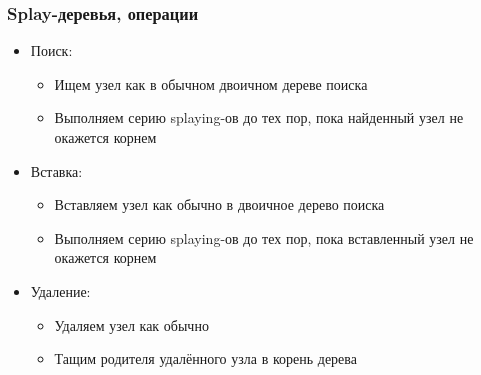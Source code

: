 \documentclass[xetex,mathserif,serif]{beamer}
\begin{document}
	\begin{frame}
		\frametitle{Splay-деревья, операции}
		\begin{itemize}
			\item Поиск:
			\begin{itemize}
				\item Ищем узел как в обычном двоичном дереве поиска
				\item Выполняем серию splaying-ов до тех пор, пока найденный узел не окажется корнем
			\end{itemize}
			\item Вставка:
			\begin{itemize}
				\item Вставляем узел как обычно в двоичное дерево поиска
				\item Выполняем серию splaying-ов до тех пор, пока вставленный узел не окажется корнем
			\end{itemize}
			\item Удаление:
			\begin{itemize}
				\item Удаляем узел как обычно
				\item Тащим родителя удалённого узла в корень дерева
			\end{itemize}
		\end{itemize}
	\end{frame}
\end{document}
